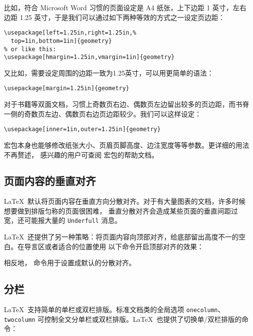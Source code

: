 比如，符合 Microsoft Word 习惯的页面设定是 A4 纸张，上下边距 1 英寸，左右边距 1.25 英寸，于是我们可以通过如下两种等效的方式之一设定页边距：
\begin{verbatim}
\usepackage[left=1.25in,right=1.25in,%
  top=1in,bottom=1in]{geometry}
% or like this:
\usepackage[hmargin=1.25in,vmargin=1in]{geometry}
\end{verbatim}

又比如，需要设定周围的边距一致为1.25英寸，可以用更简单的语法：
\begin{verbatim}
\usepackage[margin=1.25in]{geometry}
\end{verbatim}

对于书籍等双面文档，习惯上奇数页右边、偶数页左边留出较多的页边距，而书脊一侧的奇数页左边、偶数页右边页边距较少。我们可以这样设定：
\begin{verbatim}
\usepackage[inner=1in,outer=1.25in]{geometry}
\end{verbatim}

 宏包本身也能够修改纸张大小、页眉页脚高度、边注宽度等等参数。更详细的用法不再赘述，
感兴趣的用户可查阅  宏包的帮助文档。

\subsection{页面内容的垂直对齐}\label{subsec:raggedbottom}

\LaTeX\ 默认将页面内容在垂直方向分散对齐。对于有大量图表的文档，许多时候想要做到排版匀称的页面很困难，
垂直分散对齐会造成某些页面的垂直间距过宽，还可能报大量的 \texttt{Underfull}  消息。

\LaTeX\ 还提供了另一种策略：将页面内容向顶部对齐，给底部留出高度不一的空白。在导言区或者适合的位置使用
以下命令开启顶部对齐的效果：
\begin{command}
\end{command}

相反地， 命令用于设置成默认的分散对齐。

\subsection{分栏}\label{subsec:columns}

\LaTeX\ 支持简单的单栏或双栏排版。标准文档类的全局选项 \texttt{onecolumn}、\texttt{twocolumn} 
可控制全文分单栏或双栏排版。\LaTeX\ 也提供了切换单/双栏排版的命令：
\begin{command}
 \\
\end{command}

